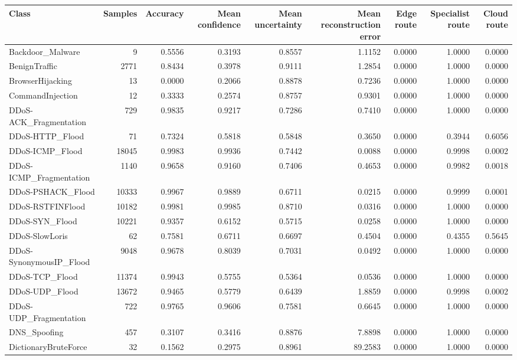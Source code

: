 \begin{tabular}{lrrrrrrrr}
\toprule
Class & Samples & Accuracy & Mean confidence & Mean uncertainty & Mean reconstruction error & Edge route & Specialist route & Cloud route \\
\midrule
Backdoor\_Malware & 9 & 0.5556 & 0.3193 & 0.8557 & 1.1152 & 0.0000 & 1.0000 & 0.0000 \\
BenignTraffic & 2771 & 0.8434 & 0.3978 & 0.9111 & 1.2854 & 0.0000 & 1.0000 & 0.0000 \\
BrowserHijacking & 13 & 0.0000 & 0.2066 & 0.8878 & 0.7236 & 0.0000 & 1.0000 & 0.0000 \\
CommandInjection & 12 & 0.3333 & 0.2574 & 0.8757 & 0.9301 & 0.0000 & 1.0000 & 0.0000 \\
DDoS-ACK\_Fragmentation & 729 & 0.9835 & 0.9217 & 0.7286 & 0.7410 & 0.0000 & 1.0000 & 0.0000 \\
DDoS-HTTP\_Flood & 71 & 0.7324 & 0.5818 & 0.5848 & 0.3650 & 0.0000 & 0.3944 & 0.6056 \\
DDoS-ICMP\_Flood & 18045 & 0.9983 & 0.9936 & 0.7442 & 0.0088 & 0.0000 & 0.9998 & 0.0002 \\
DDoS-ICMP\_Fragmentation & 1140 & 0.9658 & 0.9160 & 0.7406 & 0.4653 & 0.0000 & 0.9982 & 0.0018 \\
DDoS-PSHACK\_Flood & 10333 & 0.9967 & 0.9889 & 0.6711 & 0.0215 & 0.0000 & 0.9999 & 0.0001 \\
DDoS-RSTFINFlood & 10182 & 0.9981 & 0.9985 & 0.8710 & 0.0316 & 0.0000 & 1.0000 & 0.0000 \\
DDoS-SYN\_Flood & 10221 & 0.9357 & 0.6152 & 0.5715 & 0.0258 & 0.0000 & 1.0000 & 0.0000 \\
DDoS-SlowLoris & 62 & 0.7581 & 0.6711 & 0.6697 & 0.4504 & 0.0000 & 0.4355 & 0.5645 \\
DDoS-SynonymousIP\_Flood & 9048 & 0.9678 & 0.8039 & 0.7031 & 0.0492 & 0.0000 & 1.0000 & 0.0000 \\
DDoS-TCP\_Flood & 11374 & 0.9943 & 0.5755 & 0.5364 & 0.0536 & 0.0000 & 1.0000 & 0.0000 \\
DDoS-UDP\_Flood & 13672 & 0.9465 & 0.5779 & 0.6439 & 1.8859 & 0.0000 & 0.9998 & 0.0002 \\
DDoS-UDP\_Fragmentation & 722 & 0.9765 & 0.9606 & 0.7581 & 0.6645 & 0.0000 & 1.0000 & 0.0000 \\
DNS\_Spoofing & 457 & 0.3107 & 0.3416 & 0.8876 & 7.8898 & 0.0000 & 1.0000 & 0.0000 \\
DictionaryBruteForce & 32 & 0.1562 & 0.2975 & 0.8961 & 89.2583 & 0.0000 & 1.0000 & 0.0000 \\

\end{tabular}
